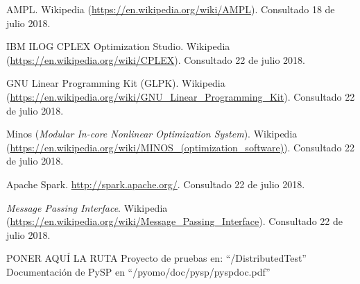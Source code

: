 \begin{thebibliography}{99}
 AMPL. Wikipedia (\url{https://en.wikipedia.org/wiki/AMPL}). Consultado 18 de julio 2018.

 IBM ILOG CPLEX Optimization Studio. Wikipedia (\url{https://en.wikipedia.org/wiki/CPLEX}). Consultado 22 de julio 2018.

 GNU Linear Programming Kit (GLPK). Wikipedia (\url{https://en.wikipedia.org/wiki/GNU_Linear_Programming_Kit}). Consultado 22 de julio 2018.

 Minos (\textit{Modular In-core Nonlinear Optimization System}). Wikipedia (\url{https://en.wikipedia.org/wiki/MINOS\_(optimization\_software)}). Consultado 22 de julio 2018.

 Apache Spark. \url{http://spark.apache.org/}. Consultado 22 de julio 2018.

 \textit{Message Passing Interface}. Wikipedia (\url{https://en.wikipedia.org/wiki/Message_Passing_Interface}). Consultado 22 de julio 2018.


 PONER AQUÍ LA RUTA
 Proyecto de pruebas en: ``/DistributedTest''
 Documentación de PySP en ``/pyomo/doc/pysp/pyspdoc.pdf''

\end{thebibliography}

